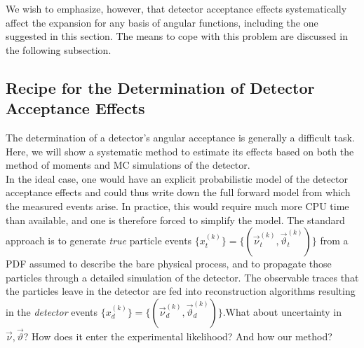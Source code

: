 \documentclass[aps,prd,reprint,nofootinbib,preprintnumbers]{revtex4}
\renewcommand{\theta}{\vartheta}
\newcommand{\fred}[1]{{\color{brown!85!black}#1}}
\begin{document}
We wish to emphasize, however, that detector acceptance effects systematically affect the expansion for any basis
of angular functions, including the one suggested in this section. The means to cope with this problem are discussed
in the following subsection.


\subsection{Recipe for the Determination of Detector Acceptance Effects}
\label{sec:systematics:acceptance}

The determination of a detector's angular acceptance is generally a difficult
task. Here, we will show a systematic method to estimate its effects
based on both the method of moments and MC simulations of the
detector.\\

In the ideal case, one would have an explicit probabilistic model of
the detector acceptance effects and could thus write down the full
forward model from which the measured events arise. In practice, this
would require much more CPU time than available, and one is therefore
forced to simplify the model. The standard approach is to generate
\emph{true} particle events $\lbrace x_t^{(k)}\rbrace =
\lbrace(\vec{\nu}^{(k)}_t,\vec\theta^{(k)}_t)\rbrace$ from a PDF
assumed to describe the bare physical process, and to propagate those
particles through a detailed simulation of the detector. The
observable traces that the particles leave in the detector are fed
into reconstruction algorithms resulting in the \emph{detector} events
$\lbrace x^{(k)}_d\rbrace = \lbrace(\vec{\nu}^{(k)}_d,
\vec\theta^{(k)}_d)\rbrace$.\fred{What about uncertainty in $\vec{\nu}, \vec{\theta}$? How does it enter the experimental likelihood? And how our method?}\\
\end{document}
